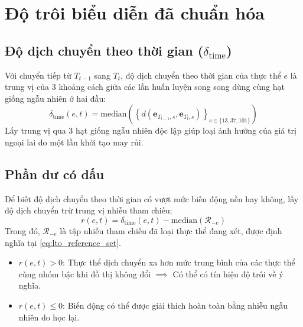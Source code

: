 \section{Độ trôi biểu diễn đã chuẩn hóa}
\label{sec:sed_plus_drift}

\subsection{Độ dịch chuyển theo thời gian (\texorpdfstring{$\delta_{\text{time}}$}{delta\_time})}
Với chuyển tiếp từ $T_{t-1}$ sang $T_t$, độ dịch chuyển theo thời gian của thực thể $e$ là trung vị của 3 khoảng cách giữa các lần huấn luyện song song dùng cùng hạt giống ngẫu nhiên ở hai đầu:
\begin{equation}
\delta_{\text{time}}(e, t) = \text{median}\left( \left\{ d\left(\mathbf{e}_{T_{t-1}, s}, \mathbf{e}_{T_t, s}\right) \right\}_{s \in \{13, 37, 101\}} \right)
\end{equation}
Lấy trung vị qua 3 hạt giống ngẫu nhiên độc lập giúp loại ảnh hưởng của giá trị ngoại lai do một lần khởi tạo may rủi.

\subsection{Phần dư có dấu}
Để biết độ dịch chuyển theo thời gian có vượt mức biến động nền hay không, lấy độ dịch chuyển trừ trung vị nhiễu tham chiếu:
\begin{equation}
r(e, t) = \delta_{\text{time}}(e, t) - \text{median}\left(\mathcal{R}_{-e}\right)
\label{eq:signed_excess}
\end{equation}
Trong đó, $\mathcal{R}_{-e}$ là tập nhiễu tham chiếu đã loại thực thể đang xét, được định nghĩa tại \eqref{eq:lto_reference_set}.
\begin{itemize}
    \item $r(e, t) > 0$: Thực thể dịch chuyển xa hơn mức trung bình của các thực thể cùng nhóm bậc khi đồ thị không đổi $\implies$ Có thể có tín hiệu độ trôi về ý nghĩa.
    \item $r(e, t) \le 0$: Biến động có thể được giải thích hoàn toàn bằng nhiễu ngẫu nhiên do học lại.
\end{itemize}

